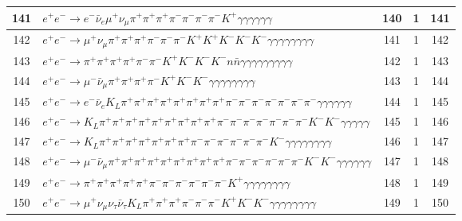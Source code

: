 \documentclass[landscape]{article}
\begin{document}
\begin{table}[htbp!]
\begin{tabular}{|c|>{\centering}p{18cm}|c|c|c|}
\hline
141 & $ e^{+} e^{-} \rightarrow e^{-} \bar{\nu}_{e} \mu^{+} \nu_{\mu} \pi^{+} \pi^{+} \pi^{+} \pi^{-} \pi^{-} \pi^{-} \pi^{-} K^{+} \gamma \gamma \gamma \gamma \gamma \gamma $ & 140 & 1 & 141 \\
\hline
142 & $ e^{+} e^{-} \rightarrow \mu^{+} \nu_{\mu} \pi^{+} \pi^{+} \pi^{+} \pi^{-} \pi^{-} \pi^{-} K^{+} K^{+} K^{-} K^{-} K^{-} \gamma \gamma \gamma \gamma \gamma \gamma \gamma \gamma $ & 141 & 1 & 142 \\
\hline
143 & $ e^{+} e^{-} \rightarrow \pi^{+} \pi^{+} \pi^{+} \pi^{+} \pi^{-} \pi^{-} K^{+} K^{-} K^{-} K^{-} n \bar{n} \gamma \gamma \gamma \gamma \gamma \gamma \gamma \gamma \gamma $ & 142 & 1 & 143 \\
\hline
144 & $ e^{+} e^{-} \rightarrow \mu^{-} \bar{\nu}_{\mu} \pi^{+} \pi^{+} \pi^{+} \pi^{-} K^{+} K^{-} K^{-} \gamma \gamma \gamma \gamma \gamma \gamma \gamma \gamma $ & 143 & 1 & 144 \\
\hline
145 & $ e^{+} e^{-} \rightarrow e^{-} \bar{\nu}_{e} K_{L} \pi^{+} \pi^{+} \pi^{+} \pi^{+} \pi^{+} \pi^{+} \pi^{+} \pi^{+} \pi^{-} \pi^{-} \pi^{-} \pi^{-} \pi^{-} \pi^{-} \pi^{-} \gamma \gamma \gamma \gamma \gamma \gamma $ & 144 & 1 & 145 \\
\hline
146 & $ e^{+} e^{-} \rightarrow K_{L} \pi^{+} \pi^{+} \pi^{+} \pi^{+} \pi^{+} \pi^{+} \pi^{+} \pi^{+} \pi^{+} \pi^{-} \pi^{-} \pi^{-} \pi^{-} \pi^{-} \pi^{-} \pi^{-} K^{-} K^{-} \gamma \gamma \gamma \gamma \gamma $ & 145 & 1 & 146 \\
\hline
147 & $ e^{+} e^{-} \rightarrow K_{L} \pi^{+} \pi^{+} \pi^{+} \pi^{+} \pi^{+} \pi^{+} \pi^{+} \pi^{-} \pi^{-} \pi^{-} \pi^{-} \pi^{-} \pi^{-} K^{-} \gamma \gamma \gamma \gamma \gamma \gamma \gamma \gamma $ & 146 & 1 & 147 \\
\hline
148 & $ e^{+} e^{-} \rightarrow \mu^{-} \bar{\nu}_{\mu} \pi^{+} \pi^{+} \pi^{+} \pi^{+} \pi^{+} \pi^{+} \pi^{+} \pi^{+} \pi^{+} \pi^{-} \pi^{-} \pi^{-} \pi^{-} \pi^{-} \pi^{-} K^{-} K^{-} \gamma \gamma \gamma \gamma \gamma \gamma $ & 147 & 1 & 148 \\
\hline
149 & $ e^{+} e^{-} \rightarrow \pi^{+} \pi^{+} \pi^{+} \pi^{+} \pi^{+} \pi^{-} \pi^{-} \pi^{-} \pi^{-} \pi^{-} \pi^{-} K^{+} \gamma \gamma \gamma \gamma \gamma \gamma \gamma \gamma $ & 148 & 1 & 149 \\
\hline
150 & $ e^{+} e^{-} \rightarrow \mu^{+} \nu_{\mu} \nu_{\tau} \bar{\nu}_{\tau} K_{L} \pi^{+} \pi^{+} \pi^{+} \pi^{-} \pi^{-} \pi^{-} K^{+} K^{-} K^{-} \gamma \gamma \gamma \gamma \gamma \gamma \gamma \gamma $ & 149 & 1 & 150 \\

\end{tabular}
\end{table}
\end{document}

